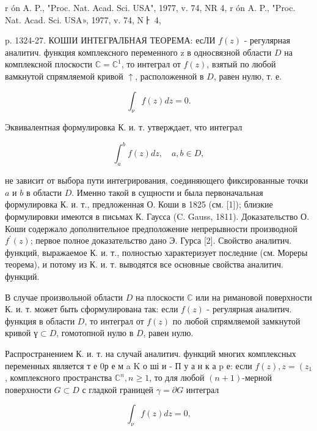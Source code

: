 \documentclass[10pt]{article}
\begin{document}
r ón A. P., "Proc. Nat. Acad. Sci. USA", 1977, v. 74, NR 4, r ón A. P., "Proc. Nat. Acad. Sci. USA», 1977, v. 74, Nㅏ 4,

p. 1324-27. КОШІИ ИНТЕГРАЛБНАЯ ТЕОРЕМА: есЛИ $f(z)$ - регулярная аналитич. функция комплексного переменного z в односвязной области $D$ на комплексной плоскости $\mathbb{C}=\mathbb{C}^{1}$, то интеграл от $f(z)$, взятый по любой вамкнутой спрямляемой кривой $\uparrow$, расположенной в $D$, равен нулю, т. е.



\[

\int_{\nu} f(z) d z=0 .

\]



Эквивалентная формулировка К. и. т. утверждает, что интеграл



\[

\int_{a}^{b} f(z) d z, \quad a, b \in D,

\]



не зависит от выбора пути интегрирования, соединяющего фиксированные точки $a$ и $b$ в области $D$. Именно такой в сущности и была первоначальная формулировка К. и. т., предложенная О. Коши в 1825 (см. [1]); близкие формулировки имеются в письмах К. Гаусса (C. Gauss, 1811). Доказательство О. Коши содержало дополнительное предположение непрерывности производной $f^{\prime}(z)$; первое полное доказательство дано Э. Гурса [2]. Свойство аналитич. функций, выражаемое К. и. т., полностью характеризует последние (см. Мореры теорема), и потому из К. и. т. выводятся все основные свойства аналитич. функций.



В случае произвольной области $D$ на плоскости $\mathbb{C}$ или на римановой поверхности К. и. т. может быть сформулирована так: если $f(z)$ - регулярная аналитич. функция в области $D$, то интеграл от $f(z)$ по любой спрямляемой замкнутой кривой $ү \subset D$, гомотопной нулю в $D$, равен нулю.



Распространением К. и. т. на случай аналитич. функций многих комплексных переменных является т е 0р е м a K о ші и - П у а н к а p е: если $f(z), z=\left(z_{1}\right.$, комплексного пространства $\mathbb{C}^{n}, n \geq 1$, то для любой $(n+1)$-мерной поверхности $G \subset D$ с гладкой границей $\gamma=\partial G$ интеграл



\[

\int_{\nu} f(z) d z=0,

\]
\end{document}
